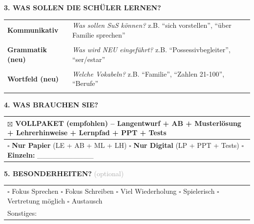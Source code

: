 \documentclass[10pt,a4paper]{article}
\begin{document}
\textcolor{spanisch}{\textbf{3. WAS SOLLEN DIE SCHÜLER LERNEN?}}
\vspace{1mm}

\begin{tabularx}{\textwidth}{|>{\raggedright\arraybackslash}p{2.8cm}|X|}
\hline
\rowcolor{lightgray}
\textbf{Kommunikativ} & \textit{Was sollen SuS können?} z.B. ``sich vorstellen'', ``über Familie sprechen'' \\
& \\
\hline
\textbf{Grammatik (neu)} & \textit{Was wird NEU eingeführt?} z.B. ``Possessivbegleiter'', ``ser/estar'' \\
& \\
\hline
\rowcolor{lightgray}
\textbf{Wortfeld (neu)} & \textit{Welche Vokabeln?} z.B. ``Familie'', ``Zahlen 21-100'', ``Berufe'' \\
& \\
\hline
\end{tabularx}

\vspace{3mm}

\textcolor{spanisch}{\textbf{4. WAS BRAUCHEN SIE?}}
\vspace{1mm}

\begin{tabularx}{\textwidth}{|X|}
\hline
\rowcolor{lightgray}
$\boxtimes$ \textbf{VOLLPAKET} (empfohlen) -- Langentwurf + AB + Musterlösung + Lehrerhinweise + Lernpfad + PPT + Tests\\
\hline
$\square$ \textbf{Nur Papier} (LE + AB + ML + LH) \hfill $\square$ \textbf{Nur Digital} (LP + PPT + Tests) \hfill $\square$ \textbf{Einzeln:} \_\_\_\_\_\_\_\_\_\_\_\\
\hline
\end{tabularx}

\vspace{3mm}

\textcolor{spanisch}{\textbf{5. BESONDERHEITEN?}} \textcolor{darkgray}{\small(optional)}
\vspace{1mm}

\begin{tabularx}{\textwidth}{|X|}
\hline
$\square$ Fokus Sprechen \quad $\square$ Fokus Schreiben \quad $\square$ Viel Wiederholung \quad $\square$ Spielerisch \quad $\square$ Vertretung möglich \quad $\square$ Austausch\\
Sonstiges: \\
\hline
\end{tabularx}

\vspace{4mm}
\end{document}
